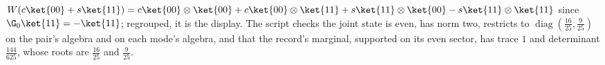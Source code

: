 $W(c\ket{00} + s\ket{11}) = c\ket{00}\otimes\ket{00} + c\ket{00}\otimes\ket{11} + s\ket{11}\otimes\ket{00} - s\ket{11}\otimes\ket{11}$ since $\G_{0}\ket{11} = -\ket{11}$; regrouped, it is the display. The script checks the joint state is even, has norm two, restricts to $\operatorname{diag}(\tfrac{16}{25}, \tfrac{9}{25})$ on the pair's algebra and on each mode's algebra, and that the record's marginal, supported on its even sector, has trace $1$ and determinant $\tfrac{144}{625}$, whose roots are $\tfrac{16}{25}$ and $\tfrac{9}{25}$.
